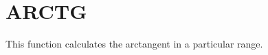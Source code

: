 \section{ARCTG}
\label{sect:arctg}

\noindent This function calculates the arctangent in a particular
range.\\
